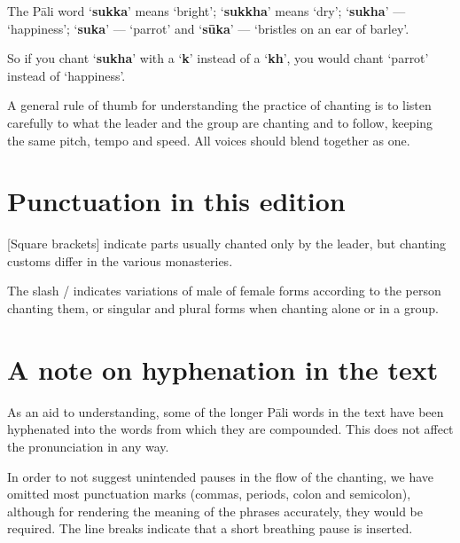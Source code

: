 The Pāli word ‘\textbf{sukka}’ means ‘bright’; ‘\textbf{sukkha}’ means
‘dry’; ‘\textbf{sukha}’ --- ‘happiness’; ‘\textbf{suka}’ --- ‘parrot’ and
‘\textbf{sūka}’ --- ‘bristles on an ear of barley’.

So if you chant ‘\textbf{sukha}’ with a ‘\textbf{k}’ instead of a
‘\textbf{kh}’, you would chant ‘parrot’ instead of ‘happiness’.

A general rule of thumb for understanding the practice of chanting is to
listen carefully to what the leader and the group are chanting and to
follow, keeping the same pitch, tempo and speed. All voices should blend
together as one.

\section{Punctuation in this edition}

[Square brackets] indicate parts usually chanted only by the leader, but
chanting customs differ in the various monasteries.

The slash / indicates variations of male of female forms according to
the person chanting them, or singular and plural forms when chanting
alone or in a group.

\section{A note on hyphenation in the text}

As an aid to understanding, some of the longer Pāli words in the text have been
hyphenated into the words from which they are compounded. This does not affect
the pronunciation in any way.

In order to not suggest unintended pauses in the flow of the chanting, we have
omitted most punctuation marks (commas, periods, colon and semicolon), although
for rendering the meaning of the phrases accurately, they would be required.
The line breaks indicate that a short breathing pause is inserted.

